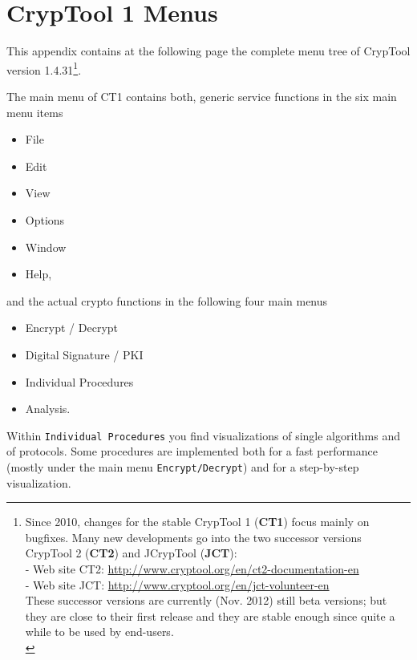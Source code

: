 
\newpage
\hypertarget{appendix-menu-overview-CT1}{}
\section{CrypTool 1 Menus}
\label{s:appendix-menu-overview-CT1}

This appendix contains at the following page the complete menu tree of
CrypTool version 1.4.31\footnote{%
  Since 2010, changes for the stable CrypTool 1 ({\bf CT1})
   focus mainly on bugfixes. Many new developments go into the two
  successor versions CrypTool 2 ({\bf CT2}) and
  JCrypTool ({\bf JCT}):\\
  - Web site CT2: \url{http://www.cryptool.org/en/ct2-documentation-en} \\
  - Web site JCT: \url{http://www.cryptool.org/en/jct-volunteer-en} \\
  These successor versions are currently (Nov. 2012) still beta versions;
  but they are close to their first release and they are stable enough
  since quite a while to be used by end-users.\\
}. 

\noindent The main menu of CT1 contains both, generic service functions in the
six main menu items
\begin{itemize}
   \item File
   \item Edit
   \item View
   \item Options
   \item Window
   \item Help,
\end{itemize}
and the actual crypto functions in the following four main menus
\begin{itemize}
   \item Encrypt / Decrypt
   \item Digital Signature / PKI
   \item Individual Procedures
   \item Analysis.
\end{itemize}

Within \verb#Individual Procedures# you find visualizations of single algorithms
and of protocols. Some procedures are implemented both for a fast performance
(mostly under the main menu \verb#Encrypt/Decrypt#) and for a step-by-step visualization.

